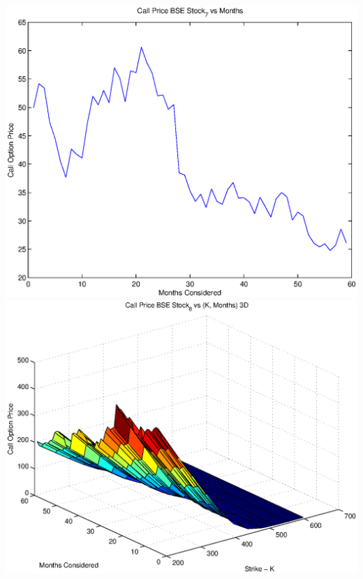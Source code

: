 \documentclass{article}
\begin{document}
\includegraphics[width=\textwidth]{Call_Price_BSE_Stock_7_vs_Months} \\

\includegraphics[width=\textwidth]{Call_Price_BSE_Stock_8_vs_(K,_Months)_3D} \\
\end{document}
